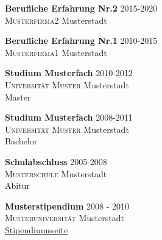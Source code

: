 \begin{mainContent}
    \begin{experience}[Erfahrung]
        \begin{cvItem}
            \textbf{Berufliche Erfahrung Nr.2} \hfill 2015-2020\\
            \textsc{Musterfirma2} Musterstadt\\
            \lipsum[1]
        \end{cvItem}
        \begin{cvItem}
            \textbf{Berufliche Erfahrung Nr.1} \hfill 2010-2015\\
            \textsc{Musterfirma1} Musterstadt\\
            \lipsum[1]
        \end{cvItem}
    \end{experience}

    \begin{education}[Bildung]
        \begin{cvItem}
            \textbf{Studium Musterfach} \hfill 2010-2012\\
            \textsc{Universität Muster} Musterstadt\\
            Master
        \end{cvItem}

        \begin{cvItem}
            \textbf{Studium Musterfach} \hfill 2008-2011\\
            \textsc{Universität Muster} Musterstadt\\
            Bachelor
        \end{cvItem}

        \begin{cvItem}
            \textbf{Schulabschluss} \hfill 2005-2008\\
            \textsc{Musterschule} Musterstadt\\
            Abitur
        \end{cvItem}

    \end{education}

    \begin{scholarship}[Stipendum]
        \begin{cvItem}
            \textbf{Musterstipendium} \hfill 2008 - 2010\\
            \textsc{Musteruniversität} Musterstadt\\
            \href{https://www.google.de}{Stipendiumsseite}
            \end{cvItem}
    \end{scholarship}


\end{mainContent}
